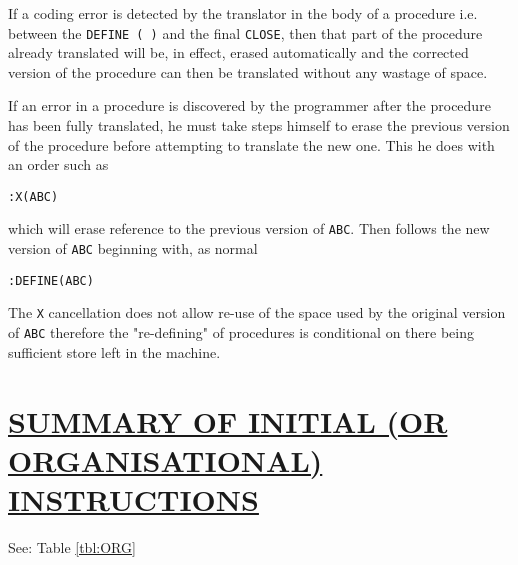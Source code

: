 \documentclass[10pt, a4paper, oneside]{article}
\newcommand{\myuline}[1]{\uline{#1}}
\newcommand{\mytt}[1]{\texttt{\scriptsize #1}}
\newcommand{\mytt}[1]{\texttt{\small #1}}
\begin{document}
\begin{multicols}{2}
If a coding error is detected by the translator
in the body of a procedure i.e. between the \mytt{DEFINE ( )}
and the final \mytt{CLOSE}, then that part of the procedure
already translated will be, in effect, erased
automatically and the corrected version of the
procedure can then be translated without any wastage
of space.

If an error in a procedure is discovered by the
programmer after the procedure has been fully translated,
he must take steps himself to erase the previous
version of the procedure before attempting to
translate the new one. This he does with an order such
as

\begin{addmargin}[1cm]{1em}%
\begin{lstlisting}
:X(ABC)
\end{lstlisting}
\end{addmargin}

which will erase reference to the previous version of
\mytt{ABC}. Then follows the new version of \mytt{ABC} beginning with,
as normal

\begin{addmargin}[1cm]{1em}%
\begin{lstlisting}
:DEFINE(ABC)
\end{lstlisting}
\end{addmargin}

The \mytt{X} cancellation does not allow re-use of the
space used by the original version of \mytt{ABC} therefore
the "re-defining" of procedures is conditional on there
being sufficient store left in the machine.

\section{\myuline{SUMMARY OF INITIAL (OR ORGANISATIONAL) INSTRUCTIONS}}

See: Table \ref{tbl:ORG}



\end{multicols}
\end{document}
